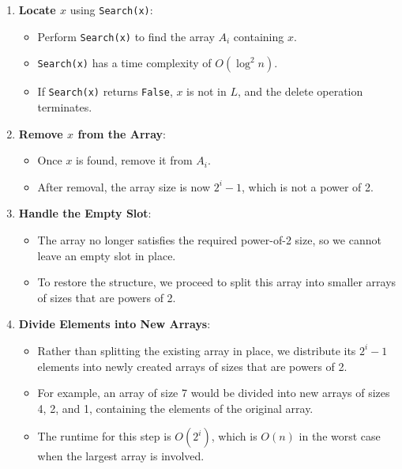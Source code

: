 \documentclass{article}
\begin{document}
\begin{enumerate}
    \item \textbf{Locate \( x \)} using \texttt{Search(x)}:
    \begin{itemize}
        \item Perform \texttt{Search(x)} to find the array \( A_i \) containing \( x \).
        \item \texttt{Search(x)} has a time complexity of \( O(\log^2 n) \).
        \item If \texttt{Search(x)} returns \texttt{False}, \( x \) is not in \( L \), and the delete operation terminates.
    \end{itemize}

    \item \textbf{Remove \( x \) from the Array}:
    \begin{itemize}
        \item Once \( x \) is found, remove it from \( A_i \).
        \item After removal, the array size is now \( 2^i - 1 \), which is not a power of 2.
    \end{itemize}

    \item \textbf{Handle the Empty Slot}:
    \begin{itemize}
        \item The array no longer satisfies the required power-of-2 size, so we cannot leave an empty slot in place.
        \item To restore the structure, we proceed to split this array into smaller arrays of sizes that are powers of 2.
    \end{itemize}

    \item \textbf{Divide Elements into New Arrays}:
    \begin{itemize}
        \item Rather than splitting the existing array in place, we distribute its \( 2^i - 1 \) elements into newly created arrays of sizes that are powers of 2.
        \item For example, an array of size 7 would be divided into new arrays of sizes 4, 2, and 1, containing the elements of the original array.
        \item The runtime for this step is \( O(2^i) \), which is \( O(n) \) in the worst case when the largest array is involved.
    \end{itemize}


\end{enumerate}
\end{document}
